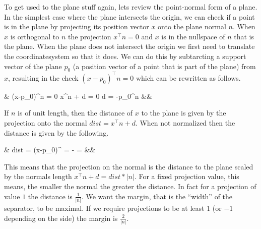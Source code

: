 \documentclass[12pt]{article}
\newcommand{\eqnsnn}[1]{\begin{flalign*} #1 \end{flalign*}}
\newcommand{\T}{^\top}
\newcommand{\equivalent}{\Leftrightarrow}
\begin{document}
To get used to the plane stuff again, lets review the point-normal form of a plane.
In the simplest case where the plane intersects the origin, we can check if a point is in the plane by projecting its position vector $x$ onto the plane normal $n$. When $x$ is orthogonal to $n$ the projection $x\T n = 0$ and $x$ is in the nullspace of $n$ that is the plane.
When the plane does not intersect the origin we first need to translate the coordinatesystem so that it does.
We can do this by subtarcting a support vector of the plane $p_0$ (a position vector of a point that is part of the plane) from $x$, resulting in the check $(x-p_0)\T n = 0$ which can be rewritten as follows.
\eqnsnn{&
(x-p_0)\T n = 0 \equivalent x\T n + d = 0 \quad\text{with constant}\quad d = -p_0\T n
&&}
If $n$ is of unit length, then the distance of $x$ to the plane is given by the projection onto the normal $dist=x\T n + d$.
When not normalized then the distance is given by the following.
\eqnsnn{&
dist = (x-p_0)\T {} = \frac{x\T n}{|n|} - \frac{p_0\T n}{|n|} = \frac{x\T n + d}{|n|}
&&}
This means that the projection on the normal is the distance to the plane scaled by the normals length $x\T n + d = dist*|n|$.
For a fixed projection value, this means, the smaller the normal the greater the distance.
In fact for a projection of value $1$ the distance is $\frac{1}{|n|}$.
We want the margin, that is the \enquote{width} of the separator, to be maximal.
If we require projections to be at least $1$ (or $-1$ depending on the side) the margin is $\frac{2}{|n|}$. 
\end{document}
